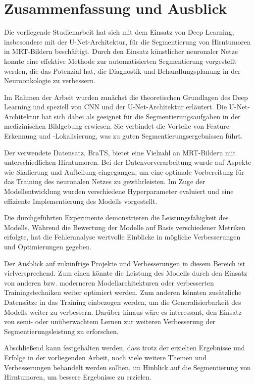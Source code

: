 \chapter{Zusammenfassung und Ausblick}
Die vorliegende Studienarbeit hat sich mit dem Einsatz von Deep Learning, insbesondere mit der U-Net-Architektur, für die Segmentierung von Hirntumoren in MRT-Bildern beschäftigt. Durch den Einsatz künstlicher neuronaler Netze konnte eine effektive Methode zur automatisierten Segmentierung vorgestellt werden, die das Potenzial hat, die Diagnostik und Behandlungsplanung in der Neuroonkologie zu verbessern.

Im Rahmen der Arbeit wurden zunächst die theoretischen Grundlagen des Deep Learning und speziell von \ac{CNN} und der U-Net-Architektur erläutert. Die U-Net-Architektur hat sich dabei als geeignet für die Segmentierungsaufgaben in der medizinischen Bildgebung erwiesen. Sie verbindet die Vorteile von Feature-Erkennung und -Lokalisierung, was zu guten Segmentierungsergebnissen führt.

Der verwendete Datensatz, \ac{BraTS}, bietet eine Vielzahl an \ac{MRT}-Bildern mit unterschiedlichen Hirntumoren. Bei der Datenvorverarbeitung wurde auf Aspekte wie Skalierung und Aufteilung eingegangen, um eine optimale Vorbereitung für das Training des neuronalen Netzes zu gewährleisten. Im Zuge der Modellentwicklung wurden verschiedene Hyperparameter evaluiert und eine effiziente Implementierung des Modells vorgestellt.

Die durchgeführten Experimente demonstrieren die Leistungsfähigkeit des Modells. Während die Bewertung der Modelle auf Basis verschiedener Metriken erfolgte, hat die Fehleranalyse wertvolle Einblicke in mögliche Verbesserungen und Optimierungen gegeben.

Der Ausblick auf zukünftige Projekte und Verbesserungen in diesem Bereich ist vielversprechend. Zum einen könnte die Leistung des Modells durch den Einsatz von anderen bzw. moderneren Modellarchitekturen oder verbesserten Trainingstechniken weiter optimiert werden. Zum anderen könnten zusätzliche Datensätze in das Training einbezogen werden, um die Generalisierbarkeit des Modells weiter zu verbessern. Darüber hinaus wäre es interessant, den Einsatz von semi- oder unüberwachtem Lernen zur weiteren Verbesserung der Segmentierungsleistung zu erforschen.

Abschließend kann festgehalten werden, dass trotz der erzielten Ergebnisse und Erfolge in der vorliegenden Arbeit, noch viele weitere Themen und Verbesserungen behandelt werden sollten, im Hinblick auf die Segmentierung von Hirntumoren, um bessere Ergebnisse zu erzielen.